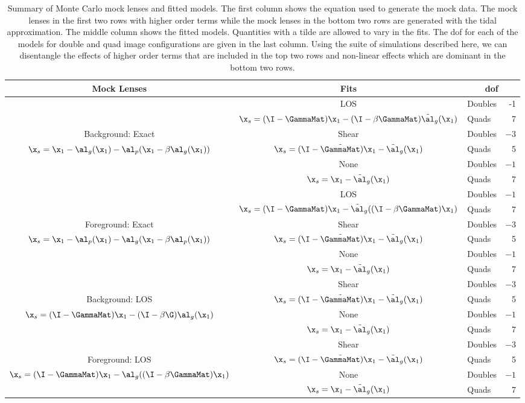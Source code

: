 \begin{table*}
\begin{tabular}{|c| c | l r |}
\hline
Mock Lenses & Fits & \multicolumn{2}{|c|}{dof} \\
\hline

& LOS & Doubles & -1 \\
&$\x_s = (\I-\GammaMat)\x_1 - (\I-\beta\GammaMat)\tilde{\al}_g(\x_1)$ & Quads &7 \\
 Background: Exact&Shear & Doubles & $-3$ \\
$\x_s = \x_1 - \al_g(\x_1) - \al_p(\x_1-\beta\al_g(\x_1))$&$\x_s = (\I-{\tilde\GammaMat})\x_1 - \tilde{\al}_g(\x_1)$&Quads& 5\\
&None&Doubles&$-1$\\
&$\x_s = \x_1 - \tilde{\al}_g(\x_1)$&Quads&7\\
\hline
&LOS & Doubles & $-1$ \\
&$\x_s = (\I-\GammaMat)\x_1 - \tilde{\al}_g((\I-\beta\GammaMat)\x_1)$ & Quads &7 \\
Foreground: Exact & Shear & Doubles & $-3$ \\
$\x_s = \x_1 - \al_p(\x_1) - \al_g(\x_1-\beta\al_p(\x_1))$&$\x_s = (\I-{\tilde\GammaMat})\x_1 - \tilde{\al}_g(\x_1)$&Quads& 5\\
&None&Doubles&$-1$\\
&$\x_s = \x_1 - \tilde{\al}_g(\x_1)$&Quads&7\\
\hline

&Shear & Doubles & $-3$ \\
Background: LOS&$\x_s = (\I-{\tilde\GammaMat})\x_1 - \tilde{\al}_g(\x_1)$&Quads& 5\\
 $\x_s = (\I-\GammaMat)\x_1 - (\I-\beta\G)\al_g(\x_1)$ &None&Doubles&$-1$\\
&$\x_s = \x_1 - \tilde{\al}_g(\x_1)$&Quads&7\\
\hline
& Shear & Doubles & $-3$ \\
Foreground: LOS&$\x_s = (\I-{\tilde\GammaMat})\x_1 - \tilde{\al}_g(\x_1)$&Quads& 5\\
$\x_s = (\I-\GammaMat)\x_1 - \al_g((\I-\beta\GammaMat)\x_1)$&None&Doubles&$-1$\\
&$\x_s = \x_1 - \tilde{\al}_g(\x_1)$&Quads&7\\
\hline
\end{tabular}
\caption[Summary of Monte Carlo mock lenses and fitted models]{Summary of Monte Carlo mock lenses and fitted models. The first column shows the equation used to generate the mock data. The mock lenses in the first two rows with higher order terms while the mock lenses in the bottom two rows are generated with the tidal approximation. The middle column shows the fitted models. Quantities with a tilde are allowed to vary in the fits. The dof for each of the models for double and quad image configurations are given in the last column. Using the suite of simulations described here, we can disentangle the effects of higher order terms that are included in the top two rows and non-linear effects which are dominant in the bottom two rows. }
\label{tab:models}
\end{table*}